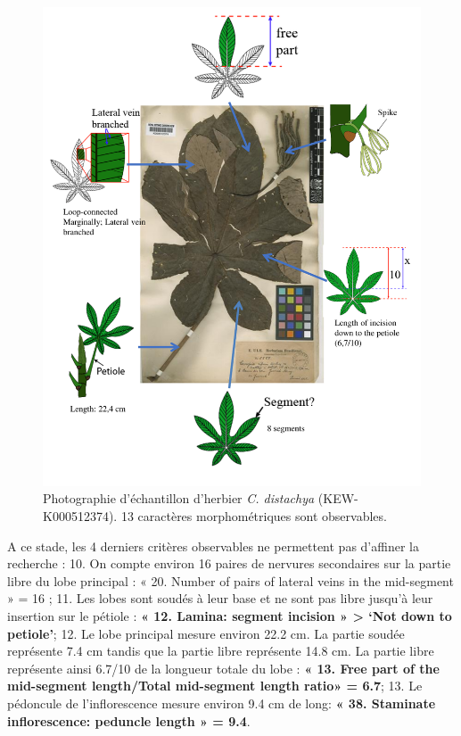 \documentclass[a4paper]{article}
\theoremstyle{definition}
\theoremstyle{definition}
\theoremstyle{definition}
\theoremstyle{remark}
\begin{document}
\begin{figure}[H]

{\centering \includegraphics[width=1\linewidth]{figure/fig7} 

}

\caption{Photographie d'échantillon d'herbier \emph{C. distachya}
(KEW-K000512374). 13 caractères morphométriques sont observables.}\label{fig:fig7}
\end{figure}

A ce stade, les 4 derniers critères observables ne permettent pas
d'affiner la recherche : 10. On compte environ 16 paires de nervures
secondaires sur la partie libre du lobe principal : « 20. Number of
pairs of lateral veins in the mid-segment » = 16 ; 11. Les lobes sont
soudés à leur base et ne sont pas libre jusqu'à leur insertion sur le
pétiole : \textbf{« 12. Lamina: segment incision » \textgreater{} `Not
down to petiole'}; 12. Le lobe principal mesure environ 22.2 cm. La
partie soudée représente 7.4 cm tandis que la partie libre représente
14.8 cm. La partie libre représente ainsi 6.7/10 de la longueur totale
du lobe : \textbf{« 13. Free part of the mid-segment length/Total
mid-segment length ratio» = 6.7}; 13. Le pédoncule de l'inflorescence
mesure environ 9.4 cm de long: \textbf{« 38. Staminate inflorescence:
peduncle length » = 9.4}.
\end{document}
